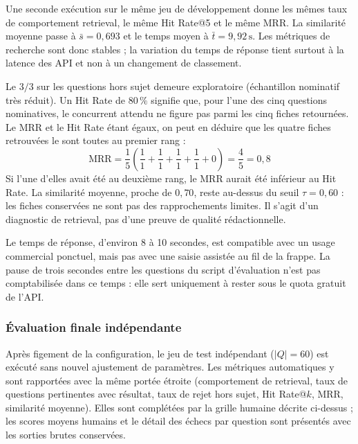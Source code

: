 Une seconde exécution sur le même jeu de développement donne les mêmes taux de
comportement retrieval, le même Hit Rate@5 et le même MRR. La similarité moyenne
passe à $\bar{s} = 0{,}693$ et le temps moyen à $\bar{t} = 9{,}92\,\text{s}$.
Les métriques de recherche sont donc stables ; la variation du temps de réponse
tient surtout à la latence des API et non à un changement de classement.

Le $3/3$ sur les questions hors sujet demeure exploratoire (échantillon
nominatif très réduit). Un Hit Rate de $80\,\%$ signifie que, pour l'une des
cinq questions nominatives, le concurrent attendu ne figure pas parmi les cinq
fiches retournées. Le MRR et le Hit Rate étant égaux, on peut en déduire que les
quatre fiches retrouvées le sont toutes au premier rang :
\begin{equation}
    \text{MRR} =
    \frac{1}{5}\left(\frac{1}{1} + \frac{1}{1} + \frac{1}{1} + \frac{1}{1} + 0\right)
    = \frac{4}{5} = 0{,}8
\end{equation}
Si l'une d'elles avait été au deuxième rang, le MRR aurait été inférieur au
Hit Rate. La similarité moyenne, proche de $0{,}70$, reste au-dessus du seuil
$\tau = 0{,}60$ : les fiches conservées ne sont pas des rapprochements limites.
Il s'agit d'un diagnostic de retrieval, pas d'une preuve de qualité
rédactionnelle.

Le temps de réponse, d'environ 8 à 10 secondes, est compatible avec un usage
commercial ponctuel, mais pas avec une saisie assistée au fil de la frappe.
La pause de trois secondes entre les questions du script d'évaluation n'est
pas comptabilisée dans ce temps : elle sert uniquement à rester sous le quota
gratuit de l'API.

\subsubsection{Évaluation finale indépendante}

Après figement de la configuration, le jeu de test indépendant ($|Q|=60$) est
exécuté sans nouvel ajustement de paramètres. Les métriques automatiques y sont
rapportées avec la même portée étroite (comportement de retrieval, taux de
questions pertinentes avec résultat, taux de rejet hors sujet, Hit Rate@$k$,
MRR, similarité moyenne). Elles sont complétées par la grille humaine décrite
ci-dessus ; les scores moyens humains et le détail des échecs par question sont
présentés avec les sorties brutes conservées.

